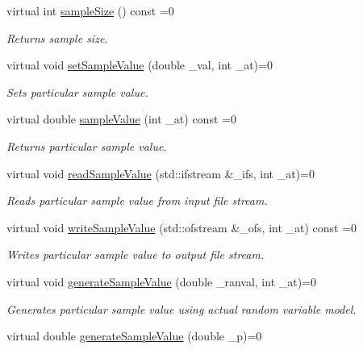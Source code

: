\begin{DoxyCompactItemize}
virtual int \hyperlink{class_go_s_u_m_1_1_c_model_variable_a6119dc5693874222727b2c2e24c7494d}{sample\-Size} () const =0
\begin{DoxyCompactList}\small\item\em Returns sample size. \end{DoxyCompactList}\item 
virtual void \hyperlink{class_go_s_u_m_1_1_c_model_variable_a08f9738a6142029c5e9f0609a171c8c5}{set\-Sample\-Value} (double \-\_\-val, int \-\_\-at)=0
\begin{DoxyCompactList}\small\item\em Sets particular sample value. \end{DoxyCompactList}\item 
virtual double \hyperlink{class_go_s_u_m_1_1_c_model_variable_aeb0c0339dee635d29b2dfea21bac6e06}{sample\-Value} (int \-\_\-at) const =0
\begin{DoxyCompactList}\small\item\em Returns particular sample value. \end{DoxyCompactList}\item 
virtual void \hyperlink{class_go_s_u_m_1_1_c_model_variable_a29c06485593cef56e0d6fc39c279feb5}{read\-Sample\-Value} (std\-::ifstream \&\-\_\-ifs, int \-\_\-at)=0
\begin{DoxyCompactList}\small\item\em Reads particular sample value from input file stream. \end{DoxyCompactList}\item 
virtual void \hyperlink{class_go_s_u_m_1_1_c_model_variable_a9de10a737f4b03f6e790e856e5822d58}{write\-Sample\-Value} (std\-::ofstream \&\-\_\-ofs, int \-\_\-at) const =0
\begin{DoxyCompactList}\small\item\em Writes particular sample value to output file stream. \end{DoxyCompactList}\item 
virtual void \hyperlink{class_go_s_u_m_1_1_c_model_variable_a9fff9e4b5f200249d1376b0890c2d132}{generate\-Sample\-Value} (double \-\_\-ranval, int \-\_\-at)=0
\begin{DoxyCompactList}\small\item\em Generates particular sample value using actual random variable model. \end{DoxyCompactList}\item 
virtual double \hyperlink{class_go_s_u_m_1_1_c_model_variable_a940f366fe5007e353cb2de3408d4d0f1}{generate\-Sample\-Value} (double \-\_\-p)=0

\end{DoxyCompactItemize}
